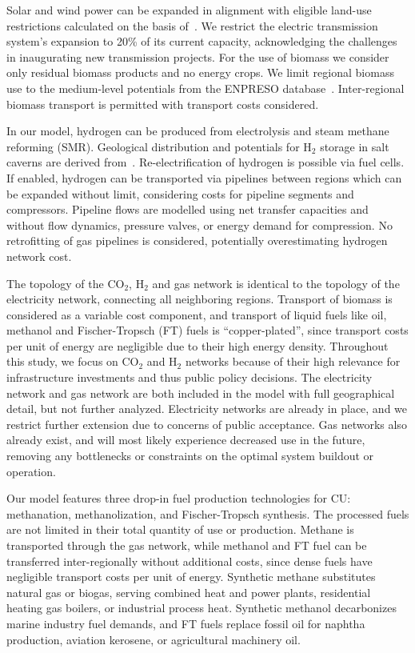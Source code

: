 \documentclass[twocolumn]{article}
\newcommand{\carbon}{CO$_2$}
\newcommand{\hydrogen}{H$_2$}
\begin{document}
Solar and wind power can be expanded in alignment with eligible land-use restrictions calculated on the basis of~\cite{eeaCorineLandCover2012,eeaNatura2000Data2016}. We restrict the electric transmission system's expansion to 20\% of its current capacity, acknowledging the challenges in inaugurating new transmission projects.
For the use of biomass we consider only residual biomass products and no energy crops. We limit regional biomass use to the medium-level potentials from the ENPRESO database~\cite{enspreso_database,instituteforenergyandtransportjointresearchcentreJRCEUTIMESModelBioenergy2015}. Inter-regional biomass transport is permitted with transport costs considered.

In our model, hydrogen can be produced from electrolysis and steam methane reforming (SMR). Geological distribution and potentials for \hydrogen{} storage in salt caverns are derived from~\cite{caglayanTechnicalPotentialSalt2020}. Re-electrification of hydrogen is possible via fuel cells. If enabled, hydrogen can be transported via pipelines between regions which can be expanded without limit, considering costs for pipeline segments and compressors. Pipeline flows are modelled using net transfer capacities and without flow dynamics, pressure valves, or energy demand for compression. No retrofitting of gas pipelines is considered, potentially overestimating hydrogen network cost.

The topology of the \carbon{}, \hydrogen{} and gas network is identical to the topology of the electricity network, connecting all neighboring regions. Transport of biomass is considered as a variable cost component, and transport of liquid fuels like oil, methanol and Fischer-Tropsch (FT) fuels is ``copper-plated'', since transport costs per unit of energy are negligible due to their high energy density. Throughout this study, we focus on \carbon{} and \hydrogen{} networks because of their high relevance for infrastructure investments and thus public policy decisions. The electricity network and gas network are both included in the model with full geographical detail, but not further analyzed. Electricity networks are already in place, and we restrict further extension due to concerns of public acceptance. Gas networks also already exist, and will most likely experience decreased use in the future, removing any bottlenecks or constraints on the optimal system buildout or operation.

Our model features three drop-in fuel production technologies for CU: methanation, methanolization, and Fischer-Tropsch synthesis. The processed fuels are not limited in their total quantity of use or production. Methane is transported through the gas network, while methanol and FT fuel can be transferred inter-regionally without additional costs, since dense fuels have negligible transport costs per unit of energy. Synthetic methane substitutes natural gas or biogas, serving combined heat and power plants, residential heating gas boilers, or industrial process heat. Synthetic methanol decarbonizes marine industry fuel demands, and FT fuels replace fossil oil for naphtha production, aviation kerosene, or agricultural machinery oil.
\end{document}
